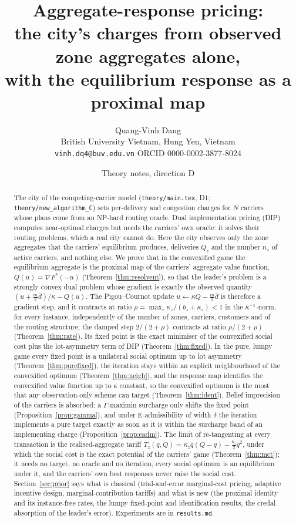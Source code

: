 \documentclass[11pt]{article}
\title{Aggregate-response pricing:\\ the city's charges from observed zone aggregates alone,\\ with the equilibrium response as a proximal map}
\author{Quang-Vinh Dang\\ British University Vietnam, Hung Yen, Vietnam\\ \texttt{vinh.dq4@buv.edu.vn} \quad ORCID 0000-0002-3877-8024}
\date{Theory notes, direction D}
\theoremstyle{definition}
\theoremstyle{remark}
\newcommand{\dbar}{\bar d}
\begin{document}
\maketitle

\begin{abstract}
The city of the competing-carrier model (\texttt{theory/main.tex}, D1; \texttt{theory/new\_algorithm\_C}) sets per-delivery and congestion charges for $N$ carriers whose plans come from an NP-hard routing oracle. Dual implementation pricing (DIP) computes near-optimal charges but needs the carriers' own oracle: it solves their routing problems, which a real city cannot do. Here the city observes only the zone aggregates that the carriers' equilibrium produces, deliveries $Q_z$ and the number $n_z$ of active carriers, and nothing else. We prove that in the convexified game the equilibrium aggregate is the proximal map of the carriers' aggregate value function, $Q(u)=\nabla F^*(-u)$ (Theorem~\ref{thm:resolvent}), so that the leader's problem is a strongly convex dual problem whose gradient is exactly the observed quantity $(u+\tfrac m2\dbar)/\kappa-Q(u)$. The Pigou--Cournot update $u\leftarrow\kappa Q-\tfrac m2\dbar$ is therefore a gradient step, and it contracts at ratio $\rho=\max_z\kappa_z/(b_z+\kappa_z)<1$ in the $\kappa^{-1}$-norm, for every instance, independently of the number of zones, carriers, customers and of the routing structure; the damped step $2/(2+\rho)$ contracts at ratio $\rho/(2+\rho)$ (Theorem~\ref{thm:rate}). Its fixed point is the exact minimiser of the convexified social cost plus the lot-asymmetry term of DIP (Theorem~\ref{thm:fixed}). In the pure, lumpy game every fixed point is a unilateral social optimum up to lot asymmetry (Theorem~\ref{thm:purefixed}), the iteration stays within an explicit neighbourhood of the convexified optimum (Theorem~\ref{thm:neigh}), and the response map identifies the convexified value function up to a constant, so the convexified optimum is the most that any observation-only scheme can target (Theorem~\ref{thm:ident}). Belief imprecision of the carriers is absorbed: a $\Gamma$-maximin surcharge only shifts the fixed point (Proposition~\ref{prop:gamma}), and under E-admissibility of width $\delta$ the iteration implements a pure target exactly as soon as it is within the surcharge band of an implementing charge (Proposition~\ref{prop:eadm}). The limit of re-tangenting at every transaction is the realised-aggregate tariff $T_z(q,Q)=\kappa_z q(Q-q)-\tfrac{b_z}2q^2$, under which the social cost is the exact potential of the carriers' game (Theorem~\ref{thm:mct}); it needs no target, no oracle and no iteration, every social optimum is an equilibrium under it, and the carriers' own best responses never raise the social cost. Section~\ref{sec:prior} says what is classical (trial-and-error marginal-cost pricing, adaptive incentive design, marginal-contribution tariffs) and what is new (the proximal identity and its instance-free rates, the lumpy fixed-point and identification results, the credal absorption of the leader's error). Experiments are in \texttt{results.md}.
\end{abstract}
\end{document}
